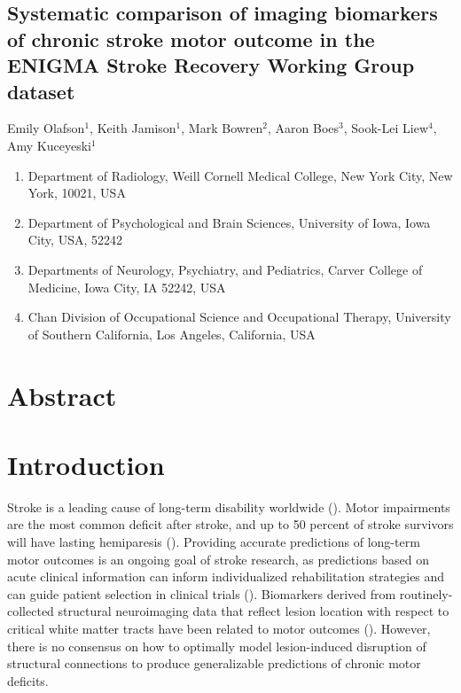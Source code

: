 \documentclass[10pt]{article}
\begin{document}
 

\begin{center}
{\large \section*{Systematic comparison of imaging biomarkers of chronic stroke motor outcome in the ENIGMA Stroke Recovery Working Group dataset}}
\end{center}

\begin{center}
Emily Olafson$^1$, Keith Jamison$^1$, Mark Bowren$^2$, Aaron Boes$^3$, Sook-Lei Liew$^4$, Amy Kuceyeski$^1$
\end{center}

\begin{enumerate}
\item \textmd{Department of Radiology, Weill Cornell Medical College, New York City, New York, 10021, USA} 
\item \textmd{Department of Psychological and Brain Sciences, University of Iowa, Iowa City, USA, 52242} 
\item \textmd{Departments of Neurology, Psychiatry, and Pediatrics, Carver College of Medicine, Iowa City, IA 52242, USA} 
\item \textmd{Chan Division of Occupational Science and Occupational Therapy, University of Southern California, Los Angeles, California, USA}
\end{enumerate}


\section{Abstract}

\section{Introduction}
Stroke is a leading cause of long-term disability worldwide (\cite{Katan2018-qn}). Motor impairments are the most common deficit after stroke, and up to 50 percent of stroke survivors will have lasting hemiparesis (\cite{Kelly-Hayes2003-sp}). Providing accurate predictions of long-term motor outcomes is an ongoing goal of stroke research, as predictions based on acute clinical information can inform individualized rehabilitation strategies and can guide patient selection in clinical trials (\cite{Bonkhoff2022-op, Boyd2017-gs}). Biomarkers derived from routinely-collected structural neuroimaging data that reflect lesion location with respect to critical white matter tracts have been related to motor outcomes (\cite{Tozlu2020-qa, Kuceyeski2016-vj, Griffis2019-cy, Salvalaggio2020-pe, Bowren2022-rs}). However, there is no consensus on how to optimally model lesion-induced disruption of structural connections to produce generalizable predictions of chronic motor deficits. 
\end{document}
